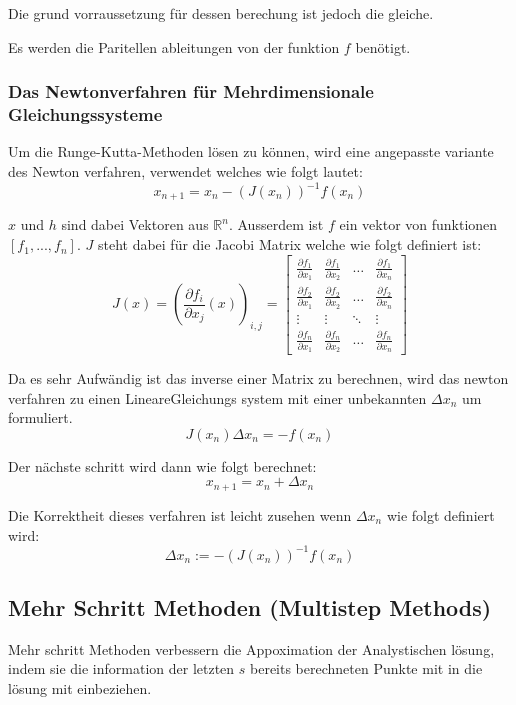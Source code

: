 Die grund vorraussetzung für dessen berechung ist jedoch die gleiche.

Es werden die Paritellen ableitungen von der funktion 
$f$ benötigt.

\subsubsection{Das Newtonverfahren für Mehrdimensionale Gleichungssysteme}

Um die Runge-Kutta-Methoden lösen zu können, wird eine angepasste variante des Newton verfahren, verwendet
welches wie folgt lautet:
$$
x_{n+1} = x_n - (J(x_n))^{-1} f(x_n)
$$

$x$ und $h$ sind dabei Vektoren aus $\mathbb{R}^n$. 
Ausserdem ist $f$ ein vektor von funktionen $[f_1, ..., f_n]$.
$J$ steht dabei für die Jacobi Matrix welche wie folgt definiert ist:
$$
J(x) = \left( \frac{\partial f_i}{\partial x_j}(x) \right)_{i, j} = \begin{bmatrix}
\frac{\partial f_1}{\partial x_1} & \frac{\partial f_1}{\partial x_2} & \dots & \frac{\partial f_1}{\partial x_n} \\
\frac{\partial f_2}{\partial x_1} & \frac{\partial f_2}{\partial x_2} & \dots & \frac{\partial f_2}{\partial x_n} \\
\vdots & \vdots & \ddots & \vdots \\
\frac{\partial f_n}{\partial x_1} & \frac{\partial f_n}{\partial x_2} & \dots & \frac{\partial f_n}{\partial x_n}
\end{bmatrix}
$$

Da es sehr Aufwändig ist das inverse einer Matrix zu berechnen, wird das newton verfahren zu einen LineareGleichungs system mit einer unbekannten $\Delta x_n$ um formuliert.
$$
J(x_n) \Delta x_n = -f(x_n)
$$

Der nächste schritt wird dann wie folgt berechnet:
$$
x_{n+1} = x_n + \Delta x_n
$$

Die Korrektheit dieses verfahren ist leicht zusehen wenn $\Delta x_n $
wie folgt definiert wird:
$$
\Delta x_n := -(J(x_n))^{-1} f(x_n)
$$


\subsection{Mehr Schritt Methoden (Multistep Methods)}

Mehr schritt Methoden verbessern die Appoximation der Analystischen lösung, indem sie 
die information der letzten $s$ bereits berechneten Punkte mit in die lösung mit einbeziehen.

